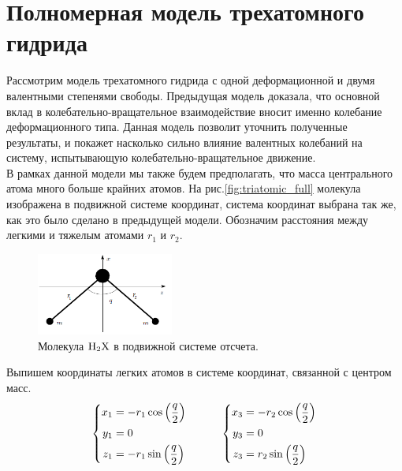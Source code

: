 \section{Полномерная модель трехатомного гидрида}

Рассмотрим модель трехатомного гидрида с одной деформационной и двумя валентными степенями свободы. Предыдущая модель доказала, что основной вклад в колебательно-вращательное взаимодействие вносит именно колебание деформационного типа. Данная модель позволит уточнить полученные результаты, и покажет насколько сильно влияние валентных колебаний на систему, испытывающую колебательно-вращательное движение. \\
В рамках данной модели мы также будем предполагать, что масса центрального атома много больше крайних атомов. На рис.\eqref{fig:triatomic_full} молекула изображена в подвижной системе координат, система координат выбрана так же, как это было сделано в предыдущей модели. Обозначим расстояния между легкими и тяжелым атомами $r_1$ и $r_2$.

\begin{figure}[H]
  \centering
	\includegraphics[width=0.4\textwidth]{../pictures/triatomic_full.png}
	\caption{Молекула $\ce{H2X}$ в подвижной системе отсчета.}
	\label{fig:triatomic_full}
\end{figure}

Выпишем координаты легких атомов в системе координат, связанной с центром масс.
\vverh
\begin{gather}
\left\{
\begin{aligned}
x_1 &= - r_1 \cos \left( \frac{q}{2} \right) \\
y_1 &= 0 \\
z_1 &= - r_1 \sin \left( \frac{q}{2} \right) 
\end{aligned}
\right. \quad \quad \quad
\left\{
\begin{aligned}
x_3 &= - r_2 \cos \left( \frac{q}{2} \right) \\
y_3 &= 0 \\
z_3 &= r_2 \sin \left( \frac{q}{2} \right)
\end{aligned}
\right.\notag
\end{gather}

